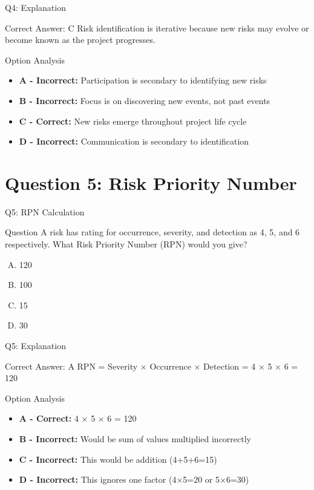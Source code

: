 \documentclass{beamer}
\begin{document}
	\begin{frame}{Q4: Explanation}
		\begin{block}{Correct Answer: C}
			Risk identification is iterative because new risks may evolve or become known as the project progresses.
		\end{block}
		\begin{block}{Option Analysis}
			\begin{itemize}
				\item \textbf{A - Incorrect:} Participation is secondary to identifying new risks
				\item \textbf{B - Incorrect:} Focus is on discovering new events, not past events
				\item \textbf{C - Correct:} New risks emerge throughout project life cycle
				\item \textbf{D - Incorrect:} Communication is secondary to identification
			\end{itemize}
		\end{block}
	\end{frame}
	
	\section{Question 5: Risk Priority Number}
	
	\begin{frame}{Q5: RPN Calculation}
		\begin{block}{Question}
			A risk has rating for occurrence, severity, and detection as 4, 5, and 6 respectively. What Risk Priority Number (RPN) would you give?
		\end{block}
		\begin{enumerate}[(A)]
			\item 120
			\item 100
			\item 15
			\item 30
		\end{enumerate}
	\end{frame}
	
	\begin{frame}{Q5: Explanation}
		\begin{block}{Correct Answer: A}
			RPN = Severity × Occurrence × Detection = 4 × 5 × 6 = 120
		\end{block}
		\begin{block}{Option Analysis}
			\begin{itemize}
				\item \textbf{A - Correct:} 4 × 5 × 6 = 120
				\item \textbf{B - Incorrect:} Would be sum of values multiplied incorrectly
				\item \textbf{C - Incorrect:} This would be addition (4+5+6=15)
				\item \textbf{D - Incorrect:} This ignores one factor (4×5=20 or 5×6=30)
			\end{itemize}
		\end{block}
	\end{frame}
	
\end{document}
